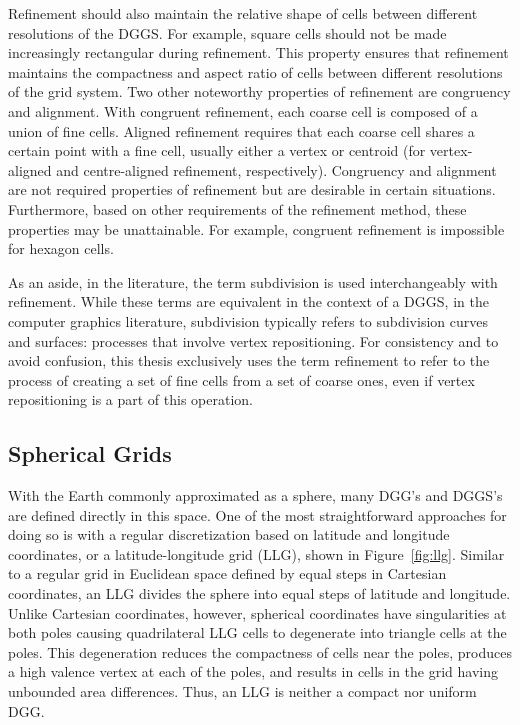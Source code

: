 Refinement should also maintain the relative shape of cells between different resolutions of the DGGS.
For example, square cells should not be made increasingly rectangular during refinement.
This property ensures that refinement maintains the compactness and aspect ratio of cells between different resolutions of the grid system.
Two other noteworthy properties of refinement are congruency and alignment.
With congruent refinement, each coarse cell is composed of a union of fine cells.
Aligned refinement requires that each coarse cell shares a certain point with a fine cell, usually either a vertex or centroid (for vertex-aligned and centre-aligned refinement, respectively).
Congruency and alignment are not required properties of refinement but are desirable in certain situations.
Furthermore, based on other requirements of the refinement method, these properties may be unattainable. For example, congruent refinement is impossible for hexagon cells.


As an aside, in the literature, the term subdivision is used interchangeably with refinement.
While these terms are equivalent in the context of a DGGS, in the computer graphics literature, subdivision typically refers to subdivision curves and surfaces: processes that involve vertex repositioning.
For consistency and to avoid confusion, this thesis exclusively uses the term refinement to refer to the process of creating a set of fine cells from a set of coarse ones, even if vertex repositioning is a part of this operation.


\subsection{Spherical Grids} \label{chap:2:spherical}
With the Earth commonly approximated as a sphere, many DGG's and DGGS's are defined directly in this space.
One of the most straightforward approaches for doing so is with a regular discretization based on latitude and longitude coordinates, or a latitude-longitude grid (LLG), shown in Figure~\ref{fig:llg}.
Similar to a regular grid in Euclidean space defined by equal steps in Cartesian coordinates, an LLG divides the sphere into equal steps of latitude and longitude.
Unlike Cartesian coordinates, however, spherical coordinates have singularities at both poles causing quadrilateral LLG cells to degenerate into triangle cells at the poles.
This degeneration reduces the compactness of cells near the poles, produces a high valence vertex at each of the poles, and results in cells in the grid having unbounded area differences.
Thus, an LLG is neither a compact nor uniform DGG.


